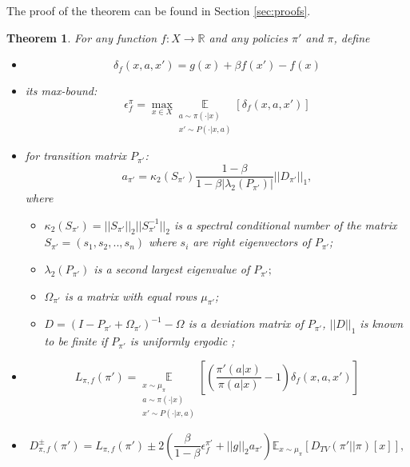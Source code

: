 \documentclass[11pt]{article}
\newcommand{\R}{\mathbb{R}}
\newcommand{\E}{\mathbb{E}}
\newtheorem{theorem}{Theorem}
\theoremstyle{definition}
\numberwithin{equation}{section}
\begin{document}
The proof of the theorem can be found in Section \ref{sec:proofs}.




\begin{theorem}\label{thm:main}
For any function $f:X\rightarrow \R $ and any policies $\pi'$ and $\pi$, define


\begin{itemize}
  \item \begin{equation}
\delta_f(x, a, x') = g(x) +\beta f(x') - f(x)
\end{equation}
  \item its max-bound:
\begin{equation}
\epsilon_f^\pi = \max\limits_{x\in X} \underset{\substack{ a\sim \pi(\cdot|x)\\x'\sim P(\cdot|x, a)}}{\E}[\delta_f(x, a, x')]
\end{equation}

\item for transition matrix $P_{\pi'}$:
\begin{equation}
 a_{\pi'} = \kappa_2(S_{\pi'})\frac{1-\beta}{ 1 - \beta|\lambda_2(P_{\pi'})|} || D_{\pi'} ||_1,
  \end{equation}
where

\begin{itemize}
  \item[*]  $\kappa_2(S_{\pi'}) = ||S_{\pi'}||_2||S_{\pi'}^{-1}||_2$ is a spectral conditional number of the matrix  $S_{\pi'} =(s_1, s_2, .., s_n)$ where $s_i$ are right eigenvectors of $P_{\pi'}$;
  \item[*] $\lambda_2(P_{\pi'})$ is a second largest eigenvalue of $P_{\pi'};$
  \item[*] $\Omega_{\pi'}$ is a matrix with equal rows $\mu_{\pi'}$;
  \item[*] $D = (I - P_{\pi'} +\Omega_{\pi'} )^{-1} -\Omega$ is a deviation matrix of $P_{\pi'}$, $||D||_1$ is known to be finite if $P_{\pi'}$ is uniformly ergodic \cite{Kartashov1985};
\end{itemize}









  \item \begin{equation}\label{L}
L_{\pi,f}(\pi') =  \underset{\substack{ x\sim \mu_\pi\\ a\sim \pi(\cdot|x)\\x'\sim P(\cdot|x, a)}}{\E}\left[\left( \frac{\pi'(a| x)}{\pi(a|x)}-1 \right)\delta_f(x, a, x') \right]
\end{equation}
  \item \begin{equation}D_{\pi, f}^{\pm} (\pi') = L_{\pi,f}(\pi')\pm 2\left(\frac{\beta}{1-\beta}\epsilon_f^{\pi'} +  ||g||_2 a_{\pi'}\right) \E_{x\sim \mu_\pi}[D_{TV}(\pi'||\pi)[x]],\end{equation}


\end{itemize}
\end{theorem}
\end{document}
